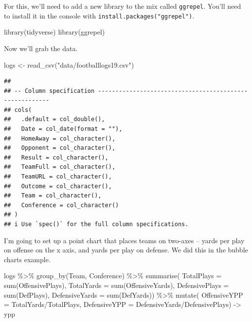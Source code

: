 \documentclass[
]{book}
\newenvironment{Shaded}{\begin{snugshade}}{\end{snugshade}}
\newcommand{\AttributeTok}[1]{\textcolor[rgb]{0.77,0.63,0.00}{#1}}
\newcommand{\FunctionTok}[1]{\textcolor[rgb]{0.00,0.00,0.00}{#1}}
\newcommand{\NormalTok}[1]{#1}
\newcommand{\OtherTok}[1]{\textcolor[rgb]{0.56,0.35,0.01}{#1}}
\newcommand{\SpecialCharTok}[1]{\textcolor[rgb]{0.00,0.00,0.00}{#1}}
\newcommand{\StringTok}[1]{\textcolor[rgb]{0.31,0.60,0.02}{#1}}
\begin{document}
For this, we'll need to add a new library to the mix called \texttt{ggrepel}. You'll need to install it in the console with \texttt{install.packages("ggrepel")}.

\begin{Shaded}
\begin{Highlighting}[]
\FunctionTok{library}\NormalTok{(tidyverse)}
\FunctionTok{library}\NormalTok{(ggrepel)}
\end{Highlighting}
\end{Shaded}

Now we'll grab the data.

\begin{Shaded}
\begin{Highlighting}[]
\NormalTok{logs }\OtherTok{\textless{}{-}} \FunctionTok{read\_csv}\NormalTok{(}\StringTok{"data/footballlogs19.csv"}\NormalTok{)}
\end{Highlighting}
\end{Shaded}

\begin{verbatim}
## 
## -- Column specification --------------------------------------------------------
## cols(
##   .default = col_double(),
##   Date = col_date(format = ""),
##   HomeAway = col_character(),
##   Opponent = col_character(),
##   Result = col_character(),
##   TeamFull = col_character(),
##   TeamURL = col_character(),
##   Outcome = col_character(),
##   Team = col_character(),
##   Conference = col_character()
## )
## i Use `spec()` for the full column specifications.
\end{verbatim}

I'm going to set up a point chart that places teams on two-axes -- yards per play on offense on the x axis, and yards per play on defense. We did this in the bubble charts example.

\begin{Shaded}
\begin{Highlighting}[]
\NormalTok{logs }\SpecialCharTok{\%\textgreater{}\%} 
  \FunctionTok{group\_by}\NormalTok{(Team, Conference) }\SpecialCharTok{\%\textgreater{}\%} 
  \FunctionTok{summarise}\NormalTok{(}
    \AttributeTok{TotalPlays =} \FunctionTok{sum}\NormalTok{(OffensivePlays), }
    \AttributeTok{TotalYards =} \FunctionTok{sum}\NormalTok{(OffensiveYards), }
    \AttributeTok{DefensivePlays =} \FunctionTok{sum}\NormalTok{(DefPlays), }
    \AttributeTok{DefensiveYards =} \FunctionTok{sum}\NormalTok{(DefYards)) }\SpecialCharTok{\%\textgreater{}\%} 
  \FunctionTok{mutate}\NormalTok{(}
    \AttributeTok{OffensiveYPP =}\NormalTok{ TotalYards}\SpecialCharTok{/}\NormalTok{TotalPlays, }
    \AttributeTok{DefensiveYPP =}\NormalTok{ DefensiveYards}\SpecialCharTok{/}\NormalTok{DefensivePlays) }\OtherTok{{-}\textgreater{}}\NormalTok{ ypp}
\end{Highlighting}
\end{Shaded}
\end{document}

